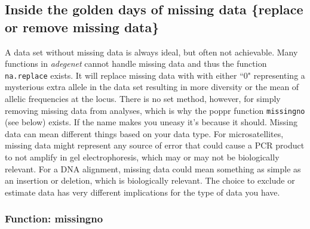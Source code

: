 \documentclass[letterpaper]{article}
\newcommand{\tab}{\hspace*{1em}}
\begin{document}
\subsection{Inside the golden days of missing data \{replace or remove missing data\}}

\tab\tab A data set without missing data is always ideal, but often not achievable. Many functions in \textit{adegenet} cannot handle missing data and thus the function \texttt{na.replace} exists. \cite{Jombart:2008} It will replace missing data with with either ``0" representing a mysterious extra allele in the data set resulting in more diversity or the mean of allelic frequencies at the locus. There is no set method, however, for simply removing missing data from analyses, which is why the poppr function \texttt{missingno} (see below) exists. If the name makes you uneasy it's because it should. Missing data can mean different things based on your data type. For microsatellites, missing data might represent any source of error that could cause a PCR product to not amplify in gel electrophoresis, which may or may not be biologically relevant. For a DNA alignment, missing data could mean something as simple as an insertion or deletion, which is biologically relevant. The choice to exclude or estimate data has very different implications for the type of data you have.
\subsubsection{Function: missingno}
\end{document}
